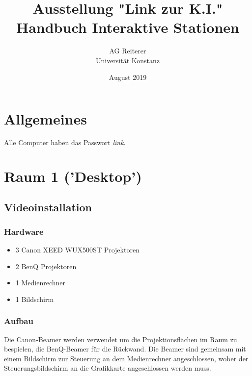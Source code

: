 \documentclass[titlepage,a4paper]{article}
\title{Ausstellung "Link zur K.I."\\
Handbuch Interaktive Stationen}
\author{
    AG Reiterer\\
    Universität Konstanz
}
\date{August 2019}
\begin{document}
\begin{titlepage}
\maketitle
\end{titlepage}



\tableofcontents

\pagebreak

\listoffigures 

\pagebreak


\section{Allgemeines}

Alle Computer haben das Passwort \textit{link}.

\section{Raum 1 ('Desktop')}

\subsection{Videoinstallation}

\subsubsection{Hardware}

\begin{itemize}
\item 3 Canon XEED WUX500ST Projektoren
\item 2 BenQ Projektoren
\item 1 Medienrechner
\item 1 Bildschirm
\end{itemize}

\subsubsection{Aufbau}

Die Canon-Beamer werden verwendet um die Projektionsflächen im Raum zu bespielen, die BenQ-Beamer für die Rückwand. Die Beamer sind gemeinsam mit einem Bildschirm zur Steuerung an dem Medienrechner angeschlossen, wober der Steuerungsbildschirm an die Grafikkarte angeschlossen werden muss.
\end{document}
